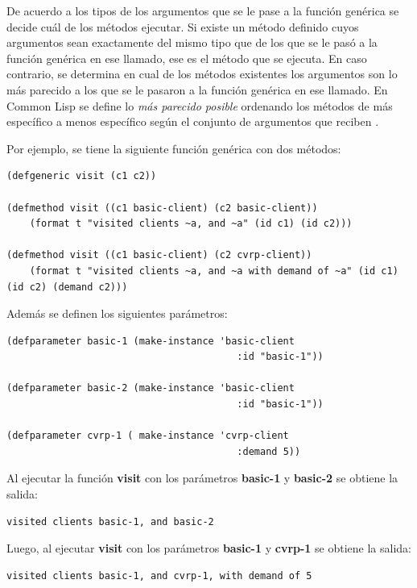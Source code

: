 De acuerdo a los tipos de los argumentos que se le pase a la función genérica se decide cuál de los métodos ejecutar. Si existe un método definido cuyos argumentos sean exactamente del mismo tipo que de los que se le pasó a la función genérica en ese llamado, ese es el método que se ejecuta. En caso contrario, se determina en cual de los métodos existentes los argumentos son lo más parecido a los que se le pasaron a la función genérica en ese llamado. En Common Lisp se define lo \textit{más parecido posible} ordenando los métodos de más específico a menos específico según el conjunto de argumentos que reciben \cite{TODO}.

Por ejemplo, se tiene la siguiente función genérica con dos métodos:

\begin{lstlisting}
(defgeneric visit (c1 c2))

(defmethod visit ((c1 basic-client) (c2 basic-client))
	(format t "visited clients ~a, and ~a" (id c1) (id c2)))

(defmethod visit ((c1 basic-client) (c2 cvrp-client))
	(format t "visited clients ~a, and ~a with demand of ~a" (id c1) (id c2) (demand c2)))

\end{lstlisting}

Además se definen los siguientes parámetros:

\begin{lstlisting}
(defparameter basic-1 (make-instance 'basic-client
										:id "basic-1"))

(defparameter basic-2 (make-instance 'basic-client
										:id "basic-1"))
	
(defparameter cvrp-1 ( make-instance 'cvrp-client
										:demand 5))
\end{lstlisting}

Al ejecutar la función \textbf{visit} con los parámetros \textbf{basic-1} y \textbf{basic-2} se obtiene la salida:

\begin{lstlisting}
visited clients basic-1, and basic-2
\end{lstlisting}

Luego, al ejecutar \textbf{visit} con los parámetros \textbf{basic-1} y \textbf{cvrp-1} se obtiene la salida:

\begin{lstlisting}
visited clients basic-1, and cvrp-1, with demand of 5
\end{lstlisting}

